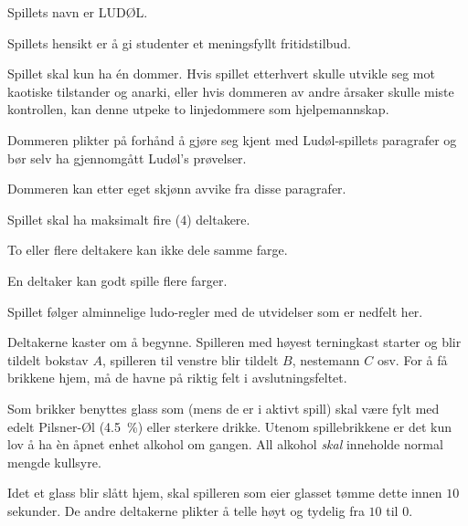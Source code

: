 \begin{ludol}

\item \label{sec:ludol} Spillets navn er \textsc{LUDØL}.

\item Spillets hensikt er å gi studenter et meningsfyllt fritidstilbud.

\item Spillet skal kun ha én dommer. Hvis spillet etterhvert skulle utvikle seg
  mot kaotiske tilstander og anarki, eller hvis dommeren av andre årsaker skulle
  miste kontrollen, kan denne utpeke to linjedommere som hjelpemannskap.

\item \label{par:forkunnskaper} Dommeren plikter på forhånd å gjøre seg kjent
  med Ludøl-spillets paragrafer og bør selv ha gjennomgått Ludøl's prøvelser.

\item \label{par:dommer} Dommeren kan etter eget skjønn avvike fra disse
  paragrafer.

\item Spillet skal ha maksimalt fire ($4$) deltakere.

\item To eller flere deltakere kan ikke dele samme farge.

\item En deltaker kan godt spille flere farger.

\item Spillet følger alminnelige ludo-regler med de utvidelser som er nedfelt her.

\item Deltakerne kaster om å begynne. Spilleren med høyest terningkast starter
  og blir tildelt bokstav $A$, spilleren til venstre blir tildelt $B$, nestemann
  $C$ osv. For å få brikkene hjem, må de havne på riktig felt i
  avslutningsfeltet.

\item Som brikker benyttes glass som (mens de er i aktivt spill) skal være fylt
  med edelt Pilsner-Øl (\SI{4.5}{\percent}) eller sterkere drikke. Utenom
  spillebrikkene er det kun lov å ha èn åpnet enhet alkohol om gangen. All alkohol
  \emph{skal} inneholde normal mengde kullsyre.

\item Idet et glass blir slått hjem, skal spilleren som eier glasset tømme dette
  innen $10$ sekunder. De andre deltakerne plikter å telle høyt og tydelig fra
  $10$ til $0$.


\end{ludol}
